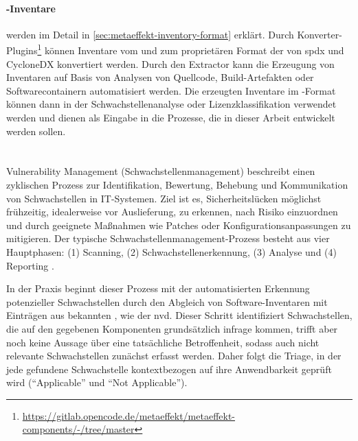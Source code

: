 \paragraph{\metaeffekt-Inventare}
werden im Detail in \autoref{sec:metaeffekt-inventory-format} erklärt.
Durch Konverter-Plugins\footnote{\url{https://gitlab.opencode.de/metaeffekt/metaeffekt-components/-/tree/master}} können Inventare vom und zum proprietären Format der \metaeffektsp von \acrshort{spdx} und CycloneDX konvertiert werden.
Durch den \metaeffektsp Extractor kann die Erzeugung von Inventaren auf Basis von Analysen von Quellcode, Build-Artefakten oder Softwarecontainern automatisiert werden.
Die erzeugten Inventare im \metaeffekt-Format können dann in der Schwachstellenanalyse oder Lizenzklassifikation verwendet werden und dienen als Eingabe in die Prozesse, die in dieser Arbeit entwickelt werden sollen.



\section{}\label{sec:grundlagen-vms}

Vulnerability Management (Schwachstellenmanagement) beschreibt einen zyklischen Prozess zur Identifikation, Bewertung, Behebung und Kommunikation von Schwachstellen in IT-Systemen.
Ziel ist es, Sicherheitslücken möglichst frühzeitig, idealerweise vor Auslieferung, zu erkennen, nach Risiko einzuordnen und durch geeignete Maßnahmen wie Patches oder Konfigurationsanpassungen zu mitigieren.
Der typische Schwachstellenmanagement-Prozess besteht aus vier Hauptphasen: (1) Scanning, (2) Schwachstellenerkennung, (3) Analyse und (4) Reporting \autocite{foreman2019vulnerabilityManagement}.

In der Praxis beginnt dieser Prozess mit der automatisierten Erkennung potenzieller Schwachstellen durch den Abgleich von Software-Inventaren mit Einträgen aus bekannten , wie der \acrshort{nvd}.
Dieser Schritt identifiziert Schwachstellen, die auf den gegebenen Komponenten grundsätzlich infrage kommen, trifft aber noch keine Aussage über eine tatsächliche Betroffenheit, sodass auch nicht relevante Schwachstellen zunächst erfasst werden.
Daher folgt die Triage, in der jede gefundene Schwachstelle kontextbezogen auf ihre Anwendbarkeit geprüft wird (\enquote{Applicable} und \enquote{Not Applicable}).

